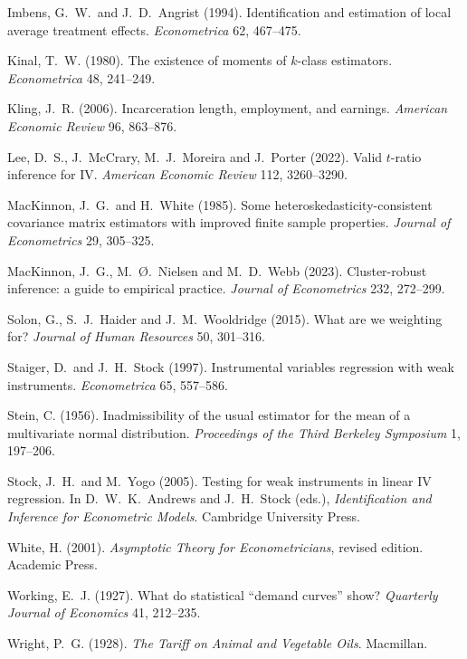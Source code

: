 \documentclass[11pt,a4paper]{article}
\begin{document}
{\begin{description}[leftmargin=1.4em,labelindent=0pt,itemsep=2pt,font=\normalfont]
\item Imbens, G.~W.\ and J.~D.~Angrist (1994). Identification and estimation of local average treatment effects. \emph{Econometrica} 62, 467--475.
\item Kinal, T.~W. (1980). The existence of moments of $k$-class estimators. \emph{Econometrica} 48, 241--249.
\item Kling, J.~R. (2006). Incarceration length, employment, and earnings. \emph{American Economic Review} 96, 863--876.
\item Lee, D.~S., J.~McCrary, M.~J.~Moreira and J.~Porter (2022). Valid $t$-ratio inference for IV. \emph{American Economic Review} 112, 3260--3290.
\item MacKinnon, J.~G.\ and H.~White (1985). Some heteroskedasticity-consistent covariance matrix estimators with improved finite sample properties. \emph{Journal of Econometrics} 29, 305--325.
\item MacKinnon, J.~G., M.~{\O}.~Nielsen and M.~D.~Webb (2023). Cluster-robust inference: a guide to empirical practice. \emph{Journal of Econometrics} 232, 272--299.
\item Solon, G., S.~J.~Haider and J.~M.~Wooldridge (2015). What are we weighting for? \emph{Journal of Human Resources} 50, 301--316.
\item Staiger, D.\ and J.~H.~Stock (1997). Instrumental variables regression with weak instruments. \emph{Econometrica} 65, 557--586.
\item Stein, C. (1956). Inadmissibility of the usual estimator for the mean of a multivariate normal distribution. \emph{Proceedings of the Third Berkeley Symposium} 1, 197--206.
\item Stock, J.~H.\ and M.~Yogo (2005). Testing for weak instruments in linear IV regression. In D.~W.~K.~Andrews and J.~H.~Stock (eds.), \emph{Identification and Inference for Econometric Models}. Cambridge University Press.
\item White, H. (2001). \emph{Asymptotic Theory for Econometricians}, revised edition. Academic Press.
\item Working, E.~J. (1927). What do statistical ``demand curves'' show? \emph{Quarterly Journal of Economics} 41, 212--235.
\item Wright, P.~G. (1928). \emph{The Tariff on Animal and Vegetable Oils}. Macmillan.
\end{description}
}
\end{document}
